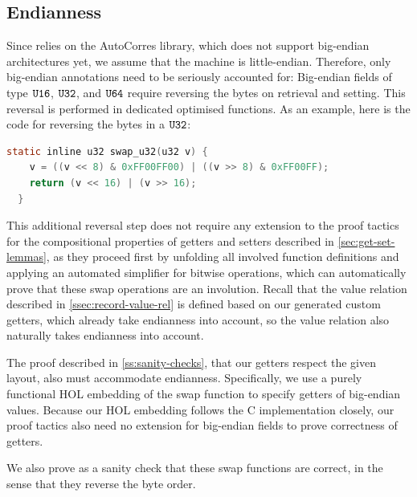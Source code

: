 \subsection{Endianness}\label{ssec:endianness-verif}

Since \Cogent relies on the AutoCorres library, which does
not support big-endian architectures yet, we assume that the machine 
is little-endian.
Therefore, only big-endian annotations need to be seriously accounted for: 
Big-endian fields of type $\texttt{U16}$, $\texttt{U32}$, and $\texttt{U64}$ require reversing the bytes on retrieval and setting. This reversal is performed in dedicated optimised functions.
As an example, here is the code for reversing the bytes in a $\texttt{U32}$:
\begin{lstlisting}[language=C]
  static inline u32 swap_u32(u32 v) {
    v = ((v << 8) & 0xFF00FF00) | ((v >> 8) & 0xFF00FF);
    return (v << 16) | (v >> 16);
  }
\end{lstlisting}
This additional reversal step does not require any
extension to the proof tactics for the compositional properties of getters and
setters described in \autoref{sec:get-set-lemmas}, as they proceed first by unfolding all involved function definitions and applying an automated simplifier for bitwise operations, which can automatically prove that these swap operations are an involution. 
Recall that the value relation described in \autoref{ssec:record-value-rel} 
is defined based on our generated custom getters, which already take endianness into account, so the value relation also naturally takes 
endianness into account. 

 The proof described in \autoref{ss:sanity-checks}, that our getters respect the given layout, also must accommodate endianness. 
Specifically, we use a purely functional HOL embedding of the swap function to 
specify getters of big-endian values. Because our HOL embedding follows the
C implementation closely, our proof tactics also need no extension for big-endian fields to prove correctness of getters.

We also prove as a sanity check that these swap functions are correct, in the sense 
 that they reverse the byte order.

